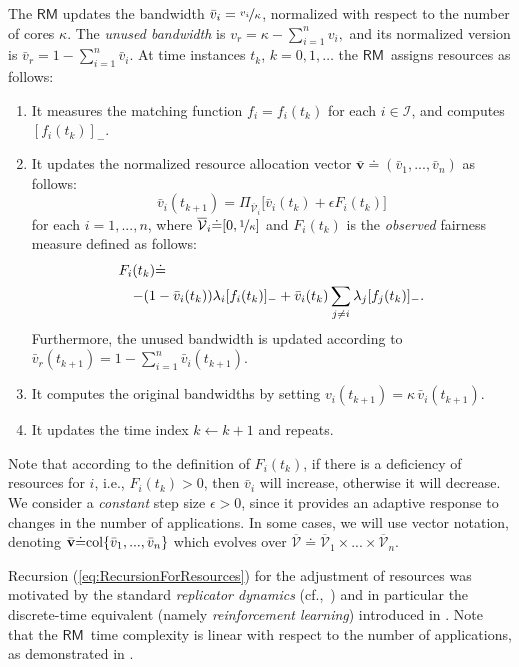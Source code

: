 \documentclass[letter,11pt]{article}
\begin{document}
The $\mathsf{RM}$ updates the bandwidth ${\bar{v}}_i=\nicefrac{v_i}{\kappa}$, normalized with respect to the number of cores $\kappa$.  The \emph{unused bandwidth} is $v_r = \kappa-\sum_{i=1}^{n}v_i,$ and its normalized version is
${\bar{v}}_r = 1-\sum_{i=1}^{n}{\bar{v}}_i$. 
At time instances $t_k$, $k=0,1,\ldots$ the {$\mathsf{RM}$}\ assigns resources as follows:
\begin{enumerate}
\item It measures the matching function $f_i = f_i(t_k)$ for each $i\in\mathcal{I}$, and computes ${[{f_i(t_k)}]_{-}}$.
\item It updates the normalized resource allocation vector ${\bar{\mathbf{v}}} {\doteq} ({\bar{v}}_1,...,{\bar{v}}_n)$ as follows:
  \begin{equation}	\label{eq:RecursionForResources}
    {\bar{v}}_i(t_{k+1}) = \Pi_{{\overline{\mathcal{V}}}_i}\Big[{\bar{v}}_i(t_k) + \epsilon F_i(t_k) \Big]
    
  \end{equation}
  for each $i=1,...,n$, where ${\overline{\mathcal{V}}}_i{\doteq}[0,\nicefrac{1}{\kappa}]$ and $F_i(t_k)$ is the \emph{observed} fairness measure defined as follows: 
  \begin{eqnarray*}  
  \lefteqn{F_i(t_k) {\doteq} } \cr &&  -(1-{\bar{v}}_i(t_k))\lambda_i {[{f_i(t_k)}]_{-}} + {\bar{v}}_i(t_k) \sum_{j\neq{i}}\lambda_j {[{f_j(t_k)}]_{-}}.
  \end{eqnarray*}
  Furthermore, the unused bandwidth is updated according to ${\bar{v}}_r(t_{k+1}) = 1-\sum_{i=1}^{n}{\bar{v}}_i(t_{k+1})$.
\item It computes the original bandwidths by setting $v_i(t_{k+1}) = \kappa\,{\bar{v}}_i(t_{k+1})$.
\item It updates the time index $k\leftarrow {k+1}$ and repeats.
\end{enumerate}

Note that according to the definition of $F_i(t_k)$, if there is a deficiency of resources for $i$, i.e., $F_i(t_k)>0$, then ${\bar{v}}_i$ will increase, otherwise it will decrease. We consider a \emph{constant} step size $\epsilon>0$, since it provides an adaptive response to changes in the number of applications.
In some cases, we will use vector notation, denoting ${\bar{\mathbf{v}}}{\doteq} {\rm col}\{{\bar{v}}_1,...,{\bar{v}}_n\}$ which evolves over ${\overline{\mathcal{V}}}{\doteq}{\overline{\mathcal{V}}}_1\times...\times{\overline{\mathcal{V}}}_n$.

Recursion (\ref{eq:RecursionForResources}) for the adjustment of resources was motivated by the standard \textit{replicator dynamics} (cf.,~\cite[Chapter~3]{Weibull97}) and in particular the discrete-time equivalent (namely \textit{reinforcement learning}) introduced in \cite{ChasparisShamma11_DGA}.
Note that the {$\mathsf{RM}$}\ time complexity is linear with respect to the number of applications, as demonstrated in \cite{MagECRTS}.
\end{document}
